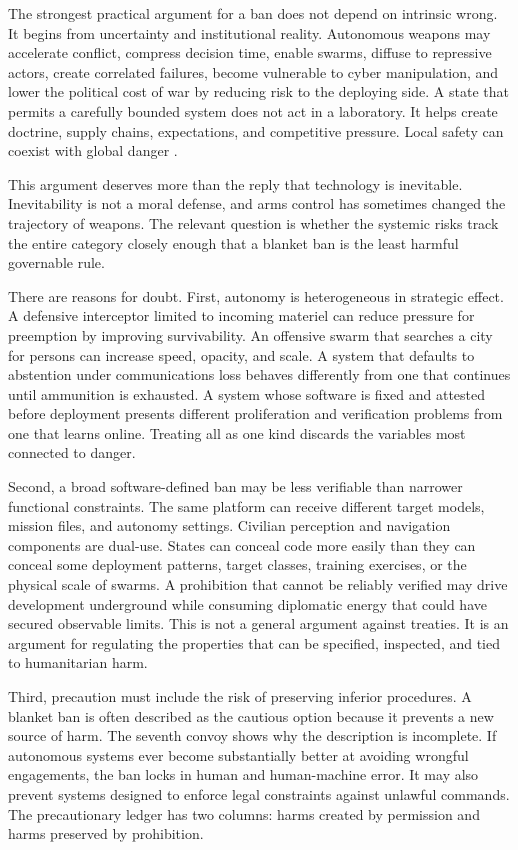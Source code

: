 \documentclass[11pt]{article}
\begin{document}
The strongest practical argument for a ban does not depend on intrinsic wrong. It begins from uncertainty and institutional reality. Autonomous weapons may accelerate conflict, compress decision time, enable swarms, diffuse to repressive actors, create correlated failures, become vulnerable to cyber manipulation, and lower the political cost of war by reducing risk to the deploying side. A state that permits a carefully bounded system does not act in a laboratory. It helps create doctrine, supply chains, expectations, and competitive pressure. Local safety can coexist with global danger \citep{altmann2017, scharre2018}.

This argument deserves more than the reply that technology is inevitable. Inevitability is not a moral defense, and arms control has sometimes changed the trajectory of weapons. The relevant question is whether the systemic risks track the entire category closely enough that a blanket ban is the least harmful governable rule.

There are reasons for doubt. First, autonomy is heterogeneous in strategic effect. A defensive interceptor limited to incoming materiel can reduce pressure for preemption by improving survivability. An offensive swarm that searches a city for persons can increase speed, opacity, and scale. A system that defaults to abstention under communications loss behaves differently from one that continues until ammunition is exhausted. A system whose software is fixed and attested before deployment presents different proliferation and verification problems from one that learns online. Treating all as one kind discards the variables most connected to danger.

Second, a broad software-defined ban may be less verifiable than narrower functional constraints. The same platform can receive different target models, mission files, and autonomy settings. Civilian perception and navigation components are dual-use. States can conceal code more easily than they can conceal some deployment patterns, target classes, training exercises, or the physical scale of swarms. A prohibition that cannot be reliably verified may drive development underground while consuming diplomatic energy that could have secured observable limits. This is not a general argument against treaties. It is an argument for regulating the properties that can be specified, inspected, and tied to humanitarian harm.

Third, precaution must include the risk of preserving inferior procedures. A blanket ban is often described as the cautious option because it prevents a new source of harm. The seventh convoy shows why the description is incomplete. If autonomous systems ever become substantially better at avoiding wrongful engagements, the ban locks in human and human-machine error. It may also prevent systems designed to enforce legal constraints against unlawful commands. The precautionary ledger has two columns: harms created by permission and harms preserved by prohibition.
\end{document}
